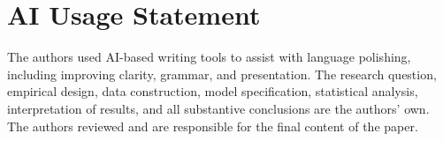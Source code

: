 \documentclass[11pt]{article}
\begin{document}
\section{AI Usage Statement}
\label{app:ai_usage_statement}

The authors used AI-based writing tools to assist with language polishing, including improving clarity, grammar, and presentation. The research question, empirical design, data construction, model specification, statistical analysis, interpretation of results, and all substantive conclusions are the authors' own. The authors reviewed and are responsible for the final content of the paper.

\clearpage


\end{document}
